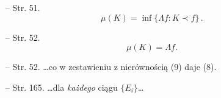 \begin{itemize}
\item[--] Str. 51.
  \begin{equation}
    \mu( K ) = \inf\{ \Lambda f : K \prec f \} \, .
    \tag{8}
  \end{equation}
\item[--] Str. 52.
  \begin{equation}
    \mu( K ) = \Lambda f .
    \tag{9}
  \end{equation}
\item[--] Str. 52. \ldots co w zestawieniu z nierównością (9) daje
  (8).
\item[--] Str. 165. \ldots dla \emph{każdego} ciągu
  $\{ E_{ i } \}$\ldots
\end{itemize}
